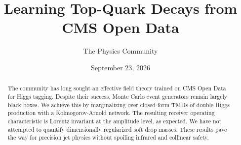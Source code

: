 \documentclass[11pt]{article}
\title{Learning Top-Quark Decays from CMS Open Data}
\author{The Physics Community}
\date{September 23, 2026}
\begin{document}
\maketitle
\begin{abstract}
The community has long sought an effective field theory trained on CMS
Open Data for Higgs tagging. Despite their success, Monte Carlo event
generators remain largely black boxes. We achieve this by marginalizing
over closed-form TMDs of double Higgs production with a
Kolmogorov-Arnold network. The resulting receiver operating
characteristic is Lorentz invariant at the amplitude level, as expected.
We have not attempted to quantify dimensionally regularized soft drop
masses. These results pave the way for precision jet physics without
spoiling infrared and collinear safety.
\end{abstract}
\tableofcontents




\nocite{*}


\end{document}

